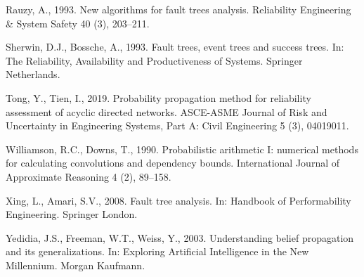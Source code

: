 \documentclass[preprint,12pt]{elsarticle}
\theoremstyle{definition}
\begin{document}
Rauzy, A., 1993. New algorithms for fault trees analysis. Reliability Engineering \& System Safety 40
(3), 203--211.

Sherwin, D.J., Bossche, A., 1993. Fault trees, event trees and success trees. In: The Reliability,
Availability and Productiveness of Systems. Springer Netherlands.

Tong, Y., Tien, I., 2019. Probability propagation method for reliability assessment of acyclic directed
networks. ASCE-ASME Journal of Risk and Uncertainty in Engineering Systems, Part A: Civil Engineering 5
(3), 04019011.

Williamson, R.C., Downs, T., 1990. Probabilistic arithmetic I: numerical methods for calculating
convolutions and dependency bounds. International Journal of Approximate Reasoning 4 (2), 89--158.

Xing, L., Amari, S.V., 2008. Fault tree analysis. In: Handbook of Performability Engineering. Springer
London.

Yedidia, J.S., Freeman, W.T., Weiss, Y., 2003. Understanding belief propagation and its
generalizations. In: Exploring Artificial Intelligence in the New Millennium. Morgan Kaufmann.

\endgroup
\end{document}
